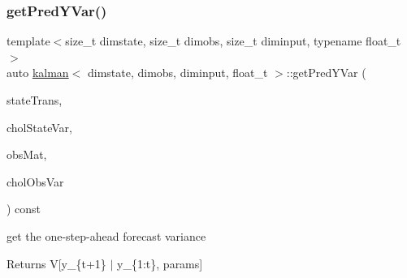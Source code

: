 \subsubsection{\texorpdfstring{get\+Pred\+Y\+Var()}{getPredYVar()}}
{\footnotesize\ttfamily template$<$size\+\_\+t dimstate, size\+\_\+t dimobs, size\+\_\+t diminput, typename float\+\_\+t $>$ \\
auto \hyperlink{classkalman}{kalman}$<$ dimstate, dimobs, diminput, float\+\_\+t $>$\+::get\+Pred\+Y\+Var (\begin{DoxyParamCaption}\item[{const \hyperlink{classkalman_a581550d9aba33245fb496b22a834831c}{ss\+Mat} \&}]{state\+Trans,  }\item[{const \hyperlink{classkalman_a581550d9aba33245fb496b22a834831c}{ss\+Mat} \&}]{chol\+State\+Var,  }\item[{const \hyperlink{classkalman_a13c0f71cc509326e1493982e9f23ebfc}{obs\+State\+Size\+Mat} \&}]{obs\+Mat,  }\item[{const \hyperlink{classkalman_a28ffd71604fac7b25492b1b43379e046}{os\+Mat} \&}]{chol\+Obs\+Var }\end{DoxyParamCaption}) const}



get the one-\/step-\/ahead forecast variance 

\begin{DoxyReturn}{Returns}
V\mbox{[}y\+\_\+\{t+1\} $\vert$ y\+\_\+\{1\+:t\}, params\mbox{]} 
\end{DoxyReturn}
\mbox{\label{classkalman_af6da5b13d55eee01cd609c1bc694b3ef}} 
